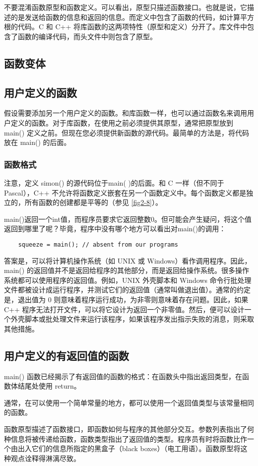 不要混淆函数原型和函数定义。可以看出，原型只描述函数接口。也就是说，它描述的是发送给函数的信息和返回的信息。而定义中包含了函数的代码，如计算平方根的代码。C 和 C++ 将库函数的这两项特性（原型和定义）分开了。库文件中包含了函数的编译代码，而头文件中则包含了原型。
\subsection{函数变体}
\subsection{用户定义的函数}
假设需要添加另一个用户定义的函数。和库函数一样，也可以通过函数名来调用用户定义的函数。对于库函数，在使用之前必须提供其原型，通常把原型放到 main() 定义之前。但现在您必须提供新函数的源代码。最简单的方法是，将代码放在 main() 的后面。
\subsubsection{函数格式}
注意，定义 simon() 的源代码位于main( )的后面。和 C 一样（但不同于 Pascal），C++ 不允许将函数定义嵌套在另一个函数定义中。每个函数定义都是独立的，所有函数的创建都是平等的（参见 \autoref{fig2-8}）。

main()返回一个int值，而程序员要求它返回整数0。但可能会产生疑问，将这个值返回到哪里了呢？毕竟，程序中没有哪个地方可以看出对main()的调用：
\begin{verbatim}
    squeeze = main(); // absent from our programs
\end{verbatim}
答案是，可以将计算机操作系统（如 UNIX 或 Windows）看作调用程序。因此，main() 的返回值并不是返回给程序的其他部分，而是返回给操作系统。很多操作系统都可以使用程序的返回值。例如，UNIX 外壳脚本和 Windows 命令行批处理文件都被设计成运行程序，并测试它们的返回值（通常叫做退出值）。通常的约定是，退出值为 0 则意味着程序运行成功，为非零则意味着存在问题。因此，如果 C++ 程序无法打开文件，可以将它设计为返回一个非零值。然后，便可以设计一个外壳脚本或批处理文件来运行该程序，如果该程序发出指示失败的消息，则采取其他措施。
\subsection{用户定义的有返回值的函数}
main() 函数已经揭示了有返回值的函数的格式：在函数头中指出返回类型，在函数体结尾处使用 return。

通常，在可以使用一个简单常量的地方，都可以使用一个返回值类型与该常量相同的函数。

函数原型描述了函数接口，即函数如何与程序的其他部分交互。参数列表指出了何种信息将被传递给函数，函数类型指出了返回值的类型。程序员有时将函数比作一个由出入它们的信息所指定的黑盒子（black boxes）（电工用语）。函数原型将这种观点诠释得淋漓尽致。

